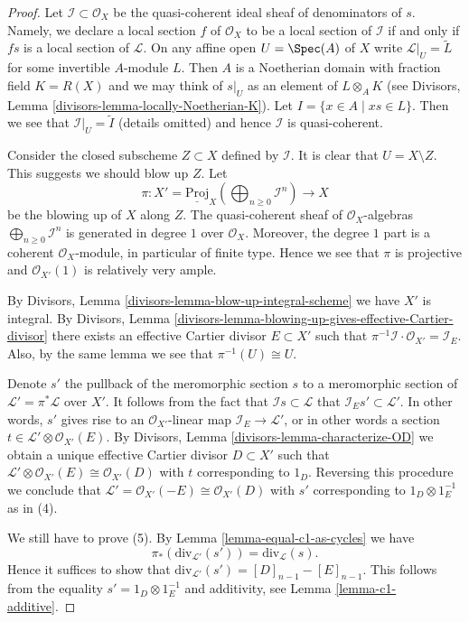 \begin{proof}
Let $\mathcal{I} \subset \mathcal{O}_X$ be the quasi-coherent ideal sheaf
of denominators of $s$. Namely, we declare a local section
$f$ of $\mathcal{O}_X$ to be a local section of $\mathcal{I}$
if and only if $fs$ is a local section of $\mathcal{L}$.
On any affine open $U = \Spec(A)$
of $X$ write $\mathcal{L}|_U = \widetilde{L}$ for some invertible
$A$-module $L$. Then $A$ is a Noetherian domain with fraction field
$K = R(X)$ and we may think of $s|_U$ as an element of
$L \otimes_A K$ (see
Divisors, Lemma \ref{divisors-lemma-locally-Noetherian-K}).
Let $I = \{x \in A \mid xs \in L\}$. Then we see that
$\mathcal{I}|_U = \widetilde{I}$ (details omitted) and hence
$\mathcal{I}$ is quasi-coherent.

\medskip\noindent
Consider the closed subscheme $Z \subset X$ defined by $\mathcal{I}$.
It is clear that $U = X \setminus Z$. This suggests we should blow
up $Z$. Let
$$
\pi : X' =
\underline{\text{Proj}}_X
\left(\bigoplus\nolimits_{n \geq 0} \mathcal{I}^n\right)
\longrightarrow
X
$$
be the blowing up of $X$ along $Z$. The quasi-coherent
sheaf of $\mathcal{O}_X$-algebras
$\bigoplus\nolimits_{n \geq 0} \mathcal{I}^n$
is generated in degree $1$ over $\mathcal{O}_X$.
Moreover, the degree $1$ part is a coherent $\mathcal{O}_X$-module,
in particular of finite type. Hence we see that $\pi$
is projective and $\mathcal{O}_{X'}(1)$ is relatively very ample.

\medskip\noindent
By Divisors, Lemma \ref{divisors-lemma-blow-up-integral-scheme}
we have $X'$ is integral. By
Divisors, Lemma \ref{divisors-lemma-blowing-up-gives-effective-Cartier-divisor}
there exists an effective Cartier divisor $E \subset X'$ such that
$\pi^{-1}\mathcal{I} \cdot \mathcal{O}_{X'} = \mathcal{I}_E$.
Also, by the same lemma we see that $\pi^{-1}(U) \cong U$.

\medskip\noindent
Denote $s'$ the pullback of the meromorphic section $s$ to a meromorphic
section of $\mathcal{L}' = \pi^*\mathcal{L}$ over $X'$.
It follows from the fact that $\mathcal{I}s \subset \mathcal{L}$
that $\mathcal{I}_Es' \subset \mathcal{L}'$. In other words,
$s'$ gives rise to an $\mathcal{O}_{X'}$-linear map
$\mathcal{I}_E \to \mathcal{L}'$, or in other words
a section $t \in \mathcal{L}' \otimes \mathcal{O}_{X'}(E)$.
By Divisors, Lemma \ref{divisors-lemma-characterize-OD} we obtain a unique
effective Cartier divisor $D \subset X'$ such that
$\mathcal{L}' \otimes \mathcal{O}_{X'}(E) \cong \mathcal{O}_{X'}(D)$
with $t$ corresponding to $1_D$. Reversing this procedure
we conclude that
$\mathcal{L}' = \mathcal{O}_{X'}(-E) \cong \mathcal{O}_{X'}(D)$
with $s'$ corresponding to $1_D \otimes 1_E^{-1}$ as in (4).

\medskip\noindent
We still have to prove (5).
By Lemma \ref{lemma-equal-c1-as-cycles} we have
$$
\pi_*(\text{div}_{\mathcal{L}'}(s')) = \text{div}_\mathcal{L}(s).
$$
Hence it suffices to show that
$\text{div}_{\mathcal{L}'}(s') = [D]_{n - 1} - [E]_{n - 1}$.
This follows from the equality
$s' = 1_D \otimes 1_E^{-1}$ and additivity, see
Lemma \ref{lemma-c1-additive}.
\end{proof}

